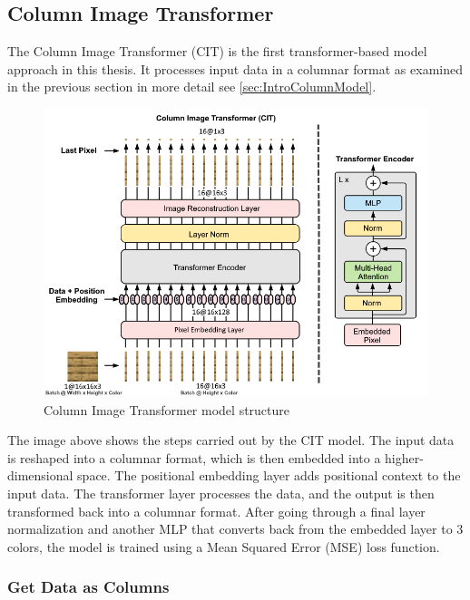 \subsection{Column Image Transformer}
    
    The Column Image Transformer (CIT) is the first transformer-based model approach in this thesis. It processes input data in a columnar format as examined in the previous section in more detail see \autoref{sec:IntroColumnModel}.


    \begin{figure}[H]
        \centering
        \includegraphics[width=1\textwidth]{imgs/CITModel.png}
        \caption{Column Image Transformer model structure}
        \label{fig:ColumnImageTransformer}
    \end{figure}

    The image above shows the steps carried out by the CIT model. The input data is reshaped into a columnar format, which is then embedded into a higher-dimensional space. The positional embedding layer adds positional context to the input data. The transformer layer processes the data, and the output is then transformed back into a columnar format. After going through a final layer normalization and another MLP that converts back from the embedded layer to 3 colors, the model is trained using a Mean Squared Error (MSE) loss function.

    \subsubsection{Get Data as Columns}

